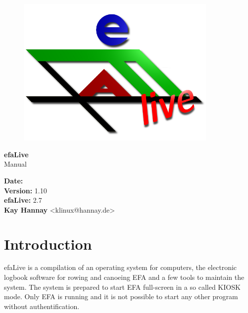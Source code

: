 \documentclass[a4paper,12pt,twoside]{article}
\title{\Title}
\author{\Author}
\date{\DocDate}
\begin{document}

\begin{titlepage}
    \vspace*{1cm}
    \begin{center}
        \begin{figure}
            \centering
            \includegraphics[width=9.745cm,height=7.308cm]{screenshots/efaLiveen-img1.png}
        \end{figure}
        \Huge
        \textbf{efaLive} \\[0.1cm]
        \LARGE
        Manual \\[5cm]
    \end{center}
    \normalsize
    \vspace*{4cm}
    \textbf{Date:} {\DocDate} \\
    \textbf{Version:} 1.10 \\
    \textbf{efaLive:} 2.7 \\
    \textbf{Kay Hannay} <klinux@hannay.de> \\
\end{titlepage}


\tableofcontents
\clearpage\setcounter{page}{1}
\section{Introduction}
efaLive is a compilation of an operating system for computers, the electronic
logbook software for rowing and canoeing EFA and a few tools to maintain the 
system. The system is prepared to start EFA full-screen in a so called KIOSK 
mode. Only EFA is running and it is not possible to start any other program 
without authentification.
\end{document}
